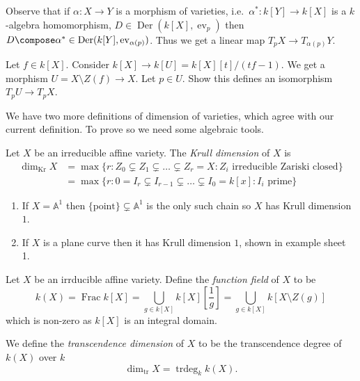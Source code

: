 \documentclass[a4paper]{article}
\renewcommand{\A}{\mathbb{A}}
\DeclareMathOperator{\ev}{ev}
\DeclareMathOperator{\Der}{Der} %
\begin{document}
Observe that if \(\alpha: X \to Y\) is a morphism of varieties, i.e.\ \(\alpha^*: k[Y] \to k[X]\) is a \(k\)-algebra homomorphism, \(D \in \Der(k[X], \ev_p)\) then \(D \compose \alpha^* \in \Der(k[Y], \ev_{\alpha(p)})\). Thus we get a linear map \(T_pX \to T_{\alpha(p)}Y\).

\begin{ex}
  Let \(f \in k[X]\). Consider \(k[X] \to k[U] = k[X][t]/(tf - 1)\). We get a morphism \(U = X \setminus Z(f) \to X\). Let \(p \in U\). Show this defines an isomorphism \(T_pU \to T_pX\).
\end{ex}

We have two more definitions of dimension of varieties, which agree with our current definition. To prove so we need some algebraic tools.

\begin{definition}
  Let \(X\) be an irreducible affine variety. The \emph{Krull dimension} of \(X\) is
  \begin{align*}
    \dim_{\text{Kr}} X
    &= \max \{r: Z_0 \subsetneq Z_1 \subsetneq \dots \subsetneq Z_r = X: Z_i \text{ irreducible Zariski closed}\} \\
    &= \max \{r: 0 = I_r \subsetneq I_{r - 1} \subsetneq \dots \subsetneq I_0 = k[x]: I_i \text{ prime}\}
  \end{align*}
\end{definition}

\begin{eg}\leavevmode
  \begin{enumerate}
  \item If \(X = \A^1\) then \(\{\text{point}\} \subsetneq \A^1\) is the only such chain so \(X\) has Krull dimension \(1\).
  \item If \(X\) is a plane curve then it has Krull dimension \(1\), shown in example sheet 1.
  \end{enumerate}
\end{eg}

\begin{definition}
  Let \(X\) be an irrducible affine variety. Define the \emph{function field} of \(X\) to be
  \[
    k(X)
    = \operatorname{Frac} k[X]
    = \bigcup_{g \in k[X]} k[X][\frac{1}{g}]
    = \bigcup_{g \in k[X]} k[X \setminus Z(g)]
  \]
  which is non-zero as \(k[X]\) is an integral domain.

  We define the \emph{transcendence dimension} of \(X\) to be the transcendence degree of \(k(X)\) over \(k\)
  \[
    \dim_{\text{tr}} X = \operatorname{trdeg}_k k(X).
  \]
\end{definition}
\end{document}

